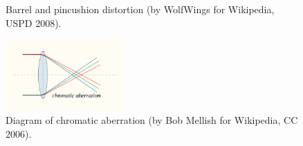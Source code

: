 \begin{figure}[ht]
    \centering
    \hfil
    \caption{Barrel and pincushion distortion (by WolfWings for Wikipedia, USPD 2008).}
    \label{fig:distortion}
\end{figure}

\begin{figure}[ht]
    \centering
    \includegraphics[width=0.4\textwidth]{figures/ca}
    \caption{Diagram of chromatic aberration (by Bob Mellish for Wikipedia, CC 2006).}
    \label{fig:chromatic-aberration}
\end{figure}
